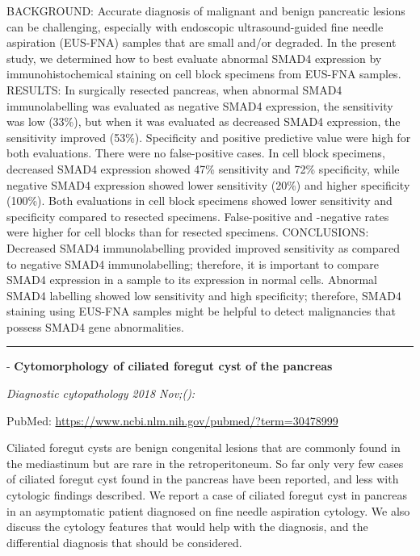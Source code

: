 \documentclass[]{article}
\begin{document}
BACKGROUND: Accurate diagnosis of malignant and benign pancreatic
lesions can be challenging, especially with endoscopic ultrasound-guided
fine needle aspiration (EUS-FNA) samples that are small and/or degraded.
In the present study, we determined how to best evaluate abnormal SMAD4
expression by immunohistochemical staining on cell block specimens from
EUS-FNA samples. RESULTS: In surgically resected pancreas, when abnormal
SMAD4 immunolabelling was evaluated as negative SMAD4 expression, the
sensitivity was low (33\%), but when it was evaluated as decreased SMAD4
expression, the sensitivity improved (53\%). Specificity and positive
predictive value were high for both evaluations. There were no
false-positive cases. In cell block specimens, decreased SMAD4
expression showed 47\% sensitivity and 72\% specificity, while negative
SMAD4 expression showed lower sensitivity (20\%) and higher specificity
(100\%). Both evaluations in cell block specimens showed lower
sensitivity and specificity compared to resected specimens.
False-positive and -negative rates were higher for cell blocks than for
resected specimens. CONCLUSIONS: Decreased SMAD4 immunolabelling
provided improved sensitivity as compared to negative SMAD4
immunolabelling; therefore, it is important to compare SMAD4 expression
in a sample to its expression in normal cells. Abnormal SMAD4 labelling
showed low sensitivity and high specificity; therefore, SMAD4 staining
using EUS-FNA samples might be helpful to detect malignancies that
possess SMAD4 gene abnormalities.

{}

{}

\begin{center}\rule{0.5\linewidth}{\linethickness}\end{center}

 - \textbf{Cytomorphology of ciliated foregut cyst of the pancreas}

\emph{Diagnostic cytopathology 2018 Nov;():}

PubMed: \url{https://www.ncbi.nlm.nih.gov/pubmed/?term=30478999}

Ciliated foregut cysts are benign congenital lesions that are commonly
found in the mediastinum but are rare in the retroperitoneum. So far
only very few cases of ciliated foregut cyst found in the pancreas have
been reported, and less with cytologic findings described. We report a
case of ciliated foregut cyst in pancreas in an asymptomatic patient
diagnosed on fine needle aspiration cytology. We also discuss the
cytology features that would help with the diagnosis, and the
differential diagnosis that should be considered.
\end{document}
